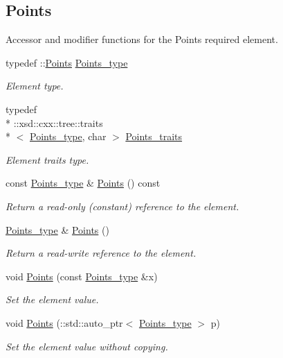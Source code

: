 \subsection*{Points}
\label{_amgrp75dd5f1160a3f02b6fae89c54361a1b3}%
Accessor and modifier functions for the Points required element. \begin{DoxyCompactItemize}
\item 
typedef \-::\hyperlink{classPoints}{Points} \hyperlink{classPieceUnstructuredGrid__t_a7747b159a3d1eee8d02a0eefaa235711}{Points\-\_\-type}
\begin{DoxyCompactList}\small\item\em Element type. \end{DoxyCompactList}\item 
typedef \\*
\-::xsd\-::cxx\-::tree\-::traits\\*
$<$ \hyperlink{classPieceUnstructuredGrid__t_a7747b159a3d1eee8d02a0eefaa235711}{Points\-\_\-type}, char $>$ \hyperlink{classPieceUnstructuredGrid__t_abdfd9c9f9eb5f43bd4cfcb2fad6d9f63}{Points\-\_\-traits}
\begin{DoxyCompactList}\small\item\em Element traits type. \end{DoxyCompactList}\item 
const \hyperlink{classPieceUnstructuredGrid__t_a7747b159a3d1eee8d02a0eefaa235711}{Points\-\_\-type} \& \hyperlink{classPieceUnstructuredGrid__t_a53dfd670cb335d13003dc229343a0fa1}{Points} () const 
\begin{DoxyCompactList}\small\item\em Return a read-\/only (constant) reference to the element. \end{DoxyCompactList}\item 
\hyperlink{classPieceUnstructuredGrid__t_a7747b159a3d1eee8d02a0eefaa235711}{Points\-\_\-type} \& \hyperlink{classPieceUnstructuredGrid__t_aa8e21b391979e8e2e22361e3b29e0276}{Points} ()
\begin{DoxyCompactList}\small\item\em Return a read-\/write reference to the element. \end{DoxyCompactList}\item 
void \hyperlink{classPieceUnstructuredGrid__t_ab653af7be8fbe0d3458bf8cd5cdf3668}{Points} (const \hyperlink{classPieceUnstructuredGrid__t_a7747b159a3d1eee8d02a0eefaa235711}{Points\-\_\-type} \&x)
\begin{DoxyCompactList}\small\item\em Set the element value. \end{DoxyCompactList}\item 
void \hyperlink{classPieceUnstructuredGrid__t_a3a44ef2850c664e89d79075a51497b17}{Points} (\-::std\-::auto\-\_\-ptr$<$ \hyperlink{classPieceUnstructuredGrid__t_a7747b159a3d1eee8d02a0eefaa235711}{Points\-\_\-type} $>$ p)
\begin{DoxyCompactList}\small\item\em Set the element value without copying. \end{DoxyCompactList}\end{DoxyCompactItemize}
